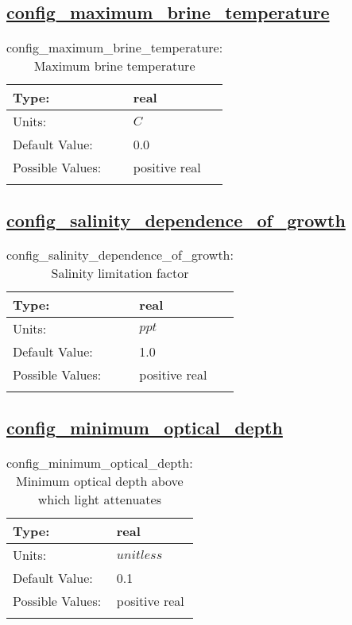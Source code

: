 \subsection[config\_maximum\_brine\_temperature]{\hyperref[sec:nm_tab_biogeochemistry]{config\_maximum\_brine\_temperature}}
\label{subsec:nm_sec_config_maximum_brine_temperature}
\begin{center}
\begin{longtable}{| p{2.0in} || p{4.0in} |}
    \hline
    Type: & real \\
    \hline
    Units: & $C$ \\
    \hline
    Default Value: & 0.0 \\
    \hline
    Possible Values: & positive real \\
    \hline
    \caption{config\_maximum\_brine\_temperature: Maximum brine temperature}
\end{longtable}
\end{center}
\subsection[config\_salinity\_dependence\_of\_growth]{\hyperref[sec:nm_tab_biogeochemistry]{config\_salinity\_dependence\_of\_growth}}
\label{subsec:nm_sec_config_salinity_dependence_of_growth}
\begin{center}
\begin{longtable}{| p{2.0in} || p{4.0in} |}
    \hline
    Type: & real \\
    \hline
    Units: & $ppt$ \\
    \hline
    Default Value: & 1.0 \\
    \hline
    Possible Values: & positive real \\
    \hline
    \caption{config\_salinity\_dependence\_of\_growth: Salinity limitation factor}
\end{longtable}
\end{center}
\subsection[config\_minimum\_optical\_depth]{\hyperref[sec:nm_tab_biogeochemistry]{config\_minimum\_optical\_depth}}
\label{subsec:nm_sec_config_minimum_optical_depth}
\begin{center}
\begin{longtable}{| p{2.0in} || p{4.0in} |}
    \hline
    Type: & real \\
    \hline
    Units: & $unitless$ \\
    \hline
    Default Value: & 0.1 \\
    \hline
    Possible Values: & positive real \\
    \hline
    \caption{config\_minimum\_optical\_depth: Minimum optical depth above which light attenuates}
\end{longtable}
\end{center}
